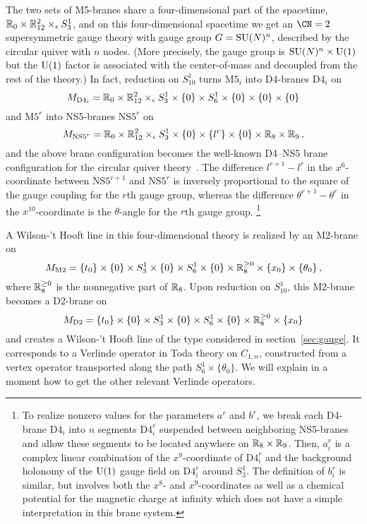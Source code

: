 The two sets of M5-branes share a four-dimensional part of the
spacetime, $\mathbb{R}_0 \times \mathbb{R}^2_{12} \times_\epsilon S^1_3$, and on this
four-dimensional spacetime we get an $\CN = 2$ supersymmetric gauge
theory with gauge group $G = \mathrm{SU}(N)^n$, described by the circular
quiver with $n$ nodes.  (More precisely, the gauge group is
$\mathrm{SU}(N)^n \times \mathrm{U}(1)$ but the $\mathrm{U}(1)$ factor is associated with the
center-of-mass and decoupled from the rest of the theory.)  In fact,
reduction on $S^1_{10}$ turns $\mathrm{M5}_i$ into D4-branes
$\mathrm{D4}_i$ on
\begin{equation}
  M_{\mathrm{D4}_i} =
  \mathbb{R}_0 \times \mathbb{R}^2_{12} \times_\epsilon S^1_3 \times \{0\}
  \times S^1_6 \times \{0\} \times \{0\} \times \{0\}
\end{equation}
and $\mathrm{M5}^r$ into NS5-branes $\mathrm{NS5}^r$ on
\begin{equation}
  M_{\mathrm{NS5}^r} =
  \mathbb{R}_0 \times \mathbb{R}^2_{12} \times_\epsilon S^1_3 \times \{0\}
  \times \{l^r\} \times \{0\} \times \mathbb{R}_8 \times \mathbb{R}_9 \,,
\end{equation}
and the above brane configuration becomes the well-known D4--NS5 brane
configuration for the circular quiver theory~\cite{Witten:1997sc}.
The difference $l^{r+1} - l^r$ in the $x^6$-coordinate between
$\mathrm{NS5}^{r+1}$ and $\mathrm{NS5}^r$ is inversely proportional to
the square of the gauge coupling for the $r$th gauge group, whereas
the difference $\theta^{r+1} - \theta^r$ in the $x^{10}$-coordinate is
the $\theta$-angle for the $r$th gauge group.%
%
\footnote{To realize nonzero values for the parameters $a^r$ and
  $b^r$, we break each D4-brane $\mathrm{D4}_i$ into $n$ segments
  $\mathrm{D4}_i^r$ suspended between neighboring NS5-branes and allow
  these segments to be located anywhere on $\mathbb{R}_8 \times \mathbb{R}_9$.  Then,
  $a^r_i$ is a complex linear combination of the $x^9$-coordinate of
  $\mathrm{D4}_i^r$ and the background holonomy of the $\mathrm{U}(1)$ gauge
  field on $\mathrm{D4}_i^r$ around $S^1_3$.  The definition of
  $b_i^r$ is similar, but involves both the $x^8$- and
  $x^9$-coordinates as well as a chemical potential for the magnetic
  charge at infinity which does not have a simple interpretation in
  this brane system.}

A Wilson-'t Hooft line in this four-dimensional theory is realized by
an M2-brane on
\begin{equation}
  M_{\mathrm{M2}} =
  \{t_0\} \times \{0\} \times S^1_3 \times \{0\}
  \times S^1_6 \times \{0\} \times \mathbb{R}^{\geq0}_8
  \times \{x_0\} \times \{\theta_0\} \,,
\end{equation}
where $\mathbb{R}^{\geq0}_8$ is the nonnegative part of $\mathbb{R}_8$.  Upon reduction on $S^1_{10}$, this M2-brane becomes a D2-brane on
\begin{equation}
  M_{\mathrm{D2}} =
  \{t_0\} \times \{0\} \times S^1_3 \times \{0\}
  \times S^1_6 \times \{0\} \times \mathbb{R}^{\geq0}_8
  \times \{x_0\}
\end{equation}
and creates a Wilson-'t Hooft line of the type considered in
section~\ref{sec:gauge}.  It corresponds to a Verlinde operator in
Toda theory on $C_{1,n}$, constructed from a vertex operator
transported along the path $S^1_6 \times \{\theta_0\}$.  We will
explain in a moment how to get the other relevant Verlinde operators.

